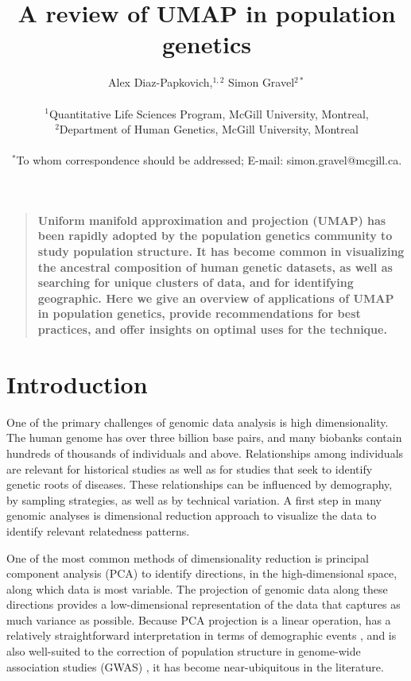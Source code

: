 \documentclass[12pt]{article}
\title{A review of UMAP in population genetics}
\author
{Alex Diaz-Papkovich,$^{1,2}$ Simon Gravel$^{2\ast}$\\
\\
\normalsize{$^{1}$Quantitative Life Sciences Program, McGill University, Montreal,}\\
\normalsize{$^{2}$Department of Human Genetics, McGill University, Montreal}\\
\\
\normalsize{$^\ast$To whom correspondence should be addressed; E-mail:  simon.gravel@mcgill.ca.}
}
\date{}
\newenvironment{sciabstract}{%
\begin{quote} \bf}
{\end{quote}}
\begin{document}
 


\baselineskip24pt


\maketitle 



\begin{sciabstract}
Uniform manifold approximation and projection (UMAP) has been rapidly adopted by the population genetics community to study population structure. It has become common in visualizing the ancestral composition of human genetic datasets, as well as searching for unique clusters of data, and for identifying geographic. Here we give an overview of applications of UMAP in population genetics, provide recommendations for best practices, and offer insights on optimal uses for the technique.
\end{sciabstract}

\section*{Introduction}

One of the primary challenges of genomic data analysis is high dimensionality. The human genome has over three billion base pairs, and many biobanks contain hundreds of thousands of individuals and above. Relationships among individuals are relevant for historical studies as well as for studies that seek to identify genetic roots of diseases. These relationships can be influenced by demography, by sampling strategies, as well as by technical variation. A first step in many genomic analyses is dimensional reduction approach to visualize the data to identify relevant relatedness patterns. 

One of the most common methods of dimensionality reduction is principal component analysis (PCA) to identify directions, in the high-dimensional space, along which data is most variable. The projection of genomic data along these directions provides a low-dimensional representation of the data that captures as much variance as possible. Because PCA projection is a linear operation, has a relatively straightforward interpretation in terms of demographic events \cite{mcvean2009genealogical}, and is also well-suited to the correction of population structure in genome-wide association studies (GWAS) \cite{patterson2006population}, it has become near-ubiquitous in the literature.
\end{document}
